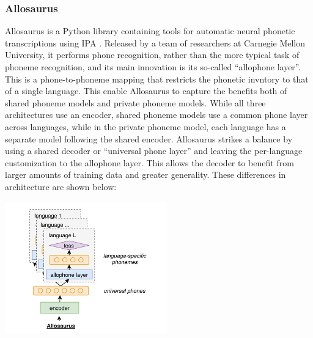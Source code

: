 \subsubsection{Allosaurus}
Allosaurus is a Python library containing tools for automatic neural phonetic transcriptions 
using IPA .
Released by a team of researchers at Carnegie Mellon University, it performs phone recognition, 
rather than the more typical task of phoneme recognition, and its main innovation is its so-called 
``allophone layer''. This is a phone-to-phoneme mapping that restricts the phonetic invntory to 
that of a single language. This enable Allosaurus to capture the benefits both of shared phoneme 
models and private phoneme models. While all three architectures use an encoder, shared phoneme models 
use a common phone layer across languages, while in the private phoneme model, each language 
has a separate model following the shared encoder. Allosaurus strikes a balance by using a shared 
decoder or ``universal phone layer'' and leaving the per-language customization to the allophone layer. 
This allows the decoder to benefit from larger amounts of training data and greater generality.
These differences in architecture are shown below:
\begin{center}
  \includegraphics[width=7cm]{img/img_alloraurus.png}
\end{center}

\cite{ctc}

%
%
%
%